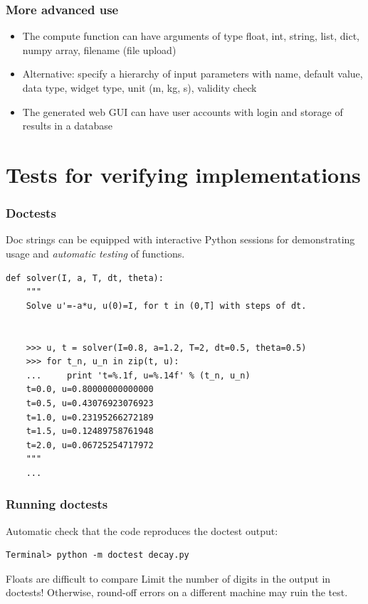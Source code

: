 \documentclass{beamer}
\begin{document}
\begin{frame}
\frametitle{More advanced use}

\begin{itemize}
 \item The compute function can have arguments of type float, int, string,
   list, dict, numpy array, filename (file upload)

 \item Alternative: specify a hierarchy of input parameters with name,
   default value, data type, widget type, unit (m, kg, s), validity check

 \item The generated web GUI can have user accounts with login and storage
   of results in a database
\end{itemize}

\noindent
\end{frame}

\section{Tests for verifying implementations}

\begin{frame}
\frametitle{Doctests}


Doc strings can be equipped with interactive Python sessions for
demonstrating usage and \emph{automatic testing} of functions.

\begin{verbatim}
def solver(I, a, T, dt, theta):
    """
    Solve u'=-a*u, u(0)=I, for t in (0,T] with steps of dt.


    >>> u, t = solver(I=0.8, a=1.2, T=2, dt=0.5, theta=0.5)
    >>> for t_n, u_n in zip(t, u):
    ...     print 't=%.1f, u=%.14f' % (t_n, u_n)
    t=0.0, u=0.80000000000000
    t=0.5, u=0.43076923076923
    t=1.0, u=0.23195266272189
    t=1.5, u=0.12489758761948
    t=2.0, u=0.06725254717972
    """
    ...
\end{verbatim}
\end{frame}

\begin{frame}
\frametitle{Running doctests}

Automatic check that the code reproduces the doctest output:

\begin{verbatim}
Terminal> python -m doctest decay.py
\end{verbatim}

\begin{block}{Floats are difficult to compare }
Limit the number of digits in the output in doctests! Otherwise,
round-off errors on a different machine may ruin the test.
\end{block}
\end{frame}
\end{document}
